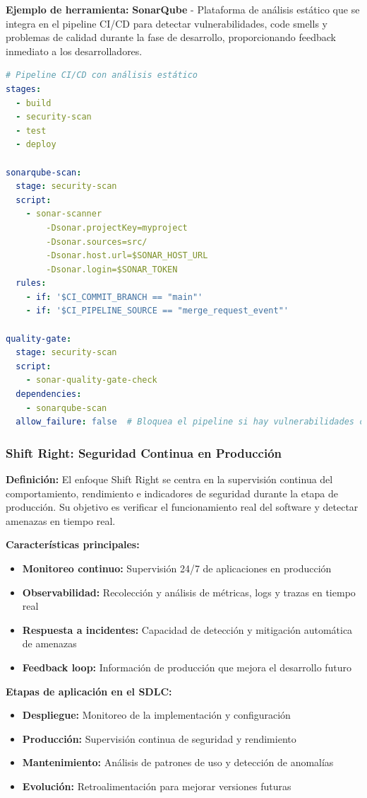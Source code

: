 {\textbf{Ejemplo de herramienta:} \textbf{SonarQube} - Plataforma de análisis estático que se integra en el pipeline CI/CD para detectar vulnerabilidades, code smells y problemas de calidad durante la fase de desarrollo, proporcionando feedback inmediato a los desarrolladores.

\begin{lstlisting}[language=yaml, caption=Integración de SonarQube en pipeline CI/CD]
# Pipeline CI/CD con análisis estático
stages:
  - build
  - security-scan
  - test
  - deploy

sonarqube-scan:
  stage: security-scan
  script:
    - sonar-scanner 
        -Dsonar.projectKey=myproject
        -Dsonar.sources=src/
        -Dsonar.host.url=$SONAR_HOST_URL
        -Dsonar.login=$SONAR_TOKEN
  rules:
    - if: '$CI_COMMIT_BRANCH == "main"'
    - if: '$CI_PIPELINE_SOURCE == "merge_request_event"'
  
quality-gate:
  stage: security-scan
  script:
    - sonar-quality-gate-check
  dependencies:
    - sonarqube-scan
  allow_failure: false  # Bloquea el pipeline si hay vulnerabilidades críticas
\end{lstlisting}

\subsubsection{Shift Right: Seguridad Continua en Producción}

\textbf{Definición:} El enfoque Shift Right se centra en la supervisión continua del comportamiento, rendimiento e indicadores de seguridad durante la etapa de producción. Su objetivo es verificar el funcionamiento real del software y detectar amenazas en tiempo real.

\textbf{Características principales:}
\begin{itemize}
    \item \textbf{Monitoreo continuo:} Supervisión 24/7 de aplicaciones en producción
    \item \textbf{Observabilidad:} Recolección y análisis de métricas, logs y trazas en tiempo real
    \item \textbf{Respuesta a incidentes:} Capacidad de detección y mitigación automática de amenazas
    \item \textbf{Feedback loop:} Información de producción que mejora el desarrollo futuro
\end{itemize}

\textbf{Etapas de aplicación en el SDLC:}
\begin{itemize}
    \item \textbf{Despliegue:} Monitoreo de la implementación y configuración
    \item \textbf{Producción:} Supervisión continua de seguridad y rendimiento
    \item \textbf{Mantenimiento:} Análisis de patrones de uso y detección de anomalías
    \item \textbf{Evolución:} Retroalimentación para mejorar versiones futuras
\end{itemize}

}
